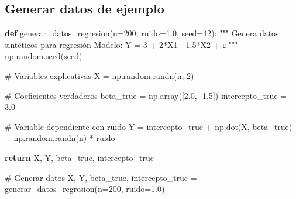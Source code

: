 \documentclass[
  doc,
  floatsintext,
  longtable,
  a4paper,
  nolmodern,
  notxfonts,
  notimes,
  12pt,
  colorlinks=true,linkcolor=blue,citecolor=blue,urlcolor=blue]{apa7}
\newenvironment{Shaded}{\begin{snugshade}}{\end{snugshade}}
\newcommand{\CommentTok}[1]{\textcolor[rgb]{0.37,0.37,0.37}{#1}}
\newcommand{\ControlFlowTok}[1]{\textcolor[rgb]{0.00,0.23,0.31}{\textbf{#1}}}
\newcommand{\DecValTok}[1]{\textcolor[rgb]{0.68,0.00,0.00}{#1}}
\newcommand{\FloatTok}[1]{\textcolor[rgb]{0.68,0.00,0.00}{#1}}
\newcommand{\KeywordTok}[1]{\textcolor[rgb]{0.00,0.23,0.31}{\textbf{#1}}}
\newcommand{\NormalTok}[1]{\textcolor[rgb]{0.00,0.23,0.31}{#1}}
\newcommand{\OperatorTok}[1]{\textcolor[rgb]{0.37,0.37,0.37}{#1}}
\begin{document}
\subsection{Generar datos de ejemplo}\label{generar-datos-de-ejemplo}

\begin{Shaded}
\begin{Highlighting}[]
\KeywordTok{def}\NormalTok{ generar\_datos\_regresion(n}\OperatorTok{=}\DecValTok{200}\NormalTok{, ruido}\OperatorTok{=}\FloatTok{1.0}\NormalTok{, seed}\OperatorTok{=}\DecValTok{42}\NormalTok{):}
    \CommentTok{"""}
\CommentTok{    Genera datos sintéticos para regresión}
\CommentTok{    }
\CommentTok{    Modelo: Y = 3 + 2*X1 {-} 1.5*X2 + ε}
\CommentTok{    """}
\NormalTok{    np.random.seed(seed)}
    
    \CommentTok{\# Variables explicativas}
\NormalTok{    X }\OperatorTok{=}\NormalTok{ np.random.randn(n, }\DecValTok{2}\NormalTok{)}
    
    \CommentTok{\# Coeficientes verdaderos}
\NormalTok{    beta\_true }\OperatorTok{=}\NormalTok{ np.array([}\FloatTok{2.0}\NormalTok{, }\OperatorTok{{-}}\FloatTok{1.5}\NormalTok{])}
\NormalTok{    intercepto\_true }\OperatorTok{=} \FloatTok{3.0}
    
    \CommentTok{\# Variable dependiente con ruido}
\NormalTok{    Y }\OperatorTok{=}\NormalTok{ intercepto\_true }\OperatorTok{+}\NormalTok{ np.dot(X, beta\_true) }\OperatorTok{+}\NormalTok{ np.random.randn(n) }\OperatorTok{*}\NormalTok{ ruido}
    
    \ControlFlowTok{return}\NormalTok{ X, Y, beta\_true, intercepto\_true}

\CommentTok{\# Generar datos}
\NormalTok{X, Y, beta\_true, intercepto\_true }\OperatorTok{=}\NormalTok{ generar\_datos\_regresion(n}\OperatorTok{=}\DecValTok{200}\NormalTok{, ruido}\OperatorTok{=}\FloatTok{1.0}\NormalTok{)}


\end{Highlighting}
\end{Shaded}
\end{document}
